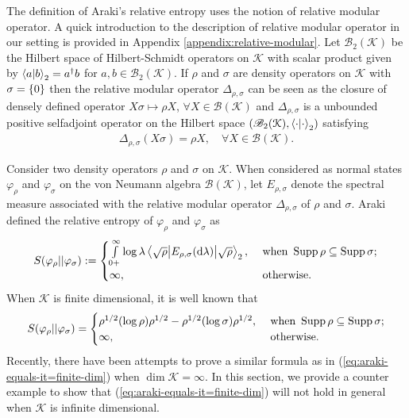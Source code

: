 \documentclass[12pt,a4paper,oneside]{article}
\numberwithin{equation}{section}
\theoremstyle{definition}  %
\theoremstyle{plain}  %
\theoremstyle{remark} %
\newcommand{\B}[1]{\mathscr{B}({#1})}
\newcommand{\Bt}[1]{\mathscr{B}_2({#1})}
\newcommand{\CK}{\mathcal{K}}
\let\tr\relax
\DeclareMathOperator{\tr}{Tr}
\let\ker\relax
\DeclareMathOperator{\ker}{Ker}
\DeclareMathOperator{\supp}{Supp}
\begin{document}
The definition of Araki's relative entropy uses the notion of relative modular operator. A quick introduction to the description of relative modular operator in our setting is provided in Appendix \ref{appendix:relative-modular}. Let $\Bt{\CK }$ be the Hilbert space of Hilbert-Schmidt operators on $\CK $ with scalar product given by $\braket{a}{b}_2= \tr a^{\dagger}b$ for $a,b\in \Bt{\CK }$. If $\rho$ and $\sigma$ are density operators on $\CK $ with $\ker \sigma =\{0\}$ then the relative modular operator $\Delta_{\rho,\sigma}$ can be seen as the closure of densely defined  operator $X\sigma \mapsto \rho X$, $\forall X\in \B{\CK }$ and $\Delta_{\rho,\sigma}$ is a unbounded positive selfadjoint operator on the Hilbert space $\left(\Bt{\CK },  \braket{\cdot}{\cdot}_2\right)$ satisfying  \begin{align}\label{eq:relative-modular-action}
  \Delta_{\rho,\sigma} (X\sigma) = \rho X, \quad \forall X\in \B{\CK }.
\end{align}

Consider two density operators $\rho$ and $\sigma$ on $\CK $.  When considered as normal states $\varphi_{\rho}$ and $\varphi_{\sigma}$ on the von Neumann algebra $\B{\CK }$, let $E_{\rho,\sigma}$ denote the spectral measure associated with the relative modular operator $\Delta_{\rho,\sigma}$ of $\rho$ and $\sigma$. Araki defined the relative entropy \cite{araki1976relative,araki1977relative} of $\varphi_\rho$ and $\varphi_\sigma$  as 
\begin{align}
    \label{eq:araki-entropy}
S(\varphi_{\rho}||\varphi_\sigma):= \begin{cases}
 \int\limits_{0+}^{\infty} \log \lambda \mel{\sqrt{\rho}}{E_{\rho,\sigma}(\dd \lambda)}{\sqrt{\rho}}_2,& \text{ when } \supp \rho \subseteq \supp \sigma;\\
   \infty, &\text{ otherwise.} 
\end{cases}
\end{align}
 When $\CK $ is finite dimensional, it is well known \cite{araki1976relative,araki1977relative,petz1986quasientropy} that \begin{align}\label{eq:araki-equals-it=finite-dim}
     S(\varphi_{\rho}||\varphi_\sigma)= \begin{cases}
   \tr \rho^{1/2}(\log \rho) \rho^{1/2}-\tr\rho^{1/2}(\log \sigma)\rho^{1/2},&\text{ when } \supp\rho\subseteq\supp \sigma;\\
   \infty, &\text{ otherwise}.
 \end{cases}
 \end{align}
 Recently, there have been attempts \cite{luczak2019relative} to prove a similar formula as in (\ref{eq:araki-equals-it=finite-dim}) when $\dim \CK  =\infty$. In this section, we provide a counter example to show that (\ref{eq:araki-equals-it=finite-dim}) will not hold in general when $\CK $ is infinite dimensional. 
\end{document}
